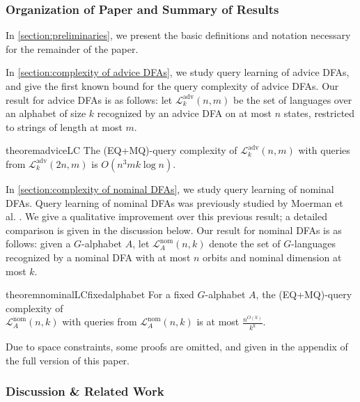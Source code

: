 \documentclass[runningheads]{llncs}
\newcommand{\mc}{\mathcal}
\newif\ifappendix
\begin{document}
\subsubsection{Organization of Paper and Summary of Results}

In \autoref{section:preliminaries}, we present the basic definitions and notation necessary for the remainder of the paper.

In \autoref{section:complexity of advice DFAs}, we study query learning of advice DFAs, and give the first known bound for the query complexity of advice DFAs.
Our result for advice DFAs is as follows: let $\mc L^{\text{adv}}_k(n,m)$ be the set of languages over an alphabet of size $k$ recognized by an advice DFA on at most $n$ states, restricted to strings of length at most $m$.
\begin{restatable*}{theorem}{adviceLC} \label{thm:EQ+MQ learning complexity of DFAs with advice}
    The (EQ+MQ)-query complexity of $\mc L^{\text{adv}}_k(n,m)$ with queries from $\mc L^{\text{adv}}_k(2n,m)$ is $O(n^3mk \log n)$.
\end{restatable*}

In \autoref{section:complexity of nominal DFAs}, we study query learning of nominal DFAs.
Query learning of nominal DFAs was previously studied by Moerman et al. \cite{moerman-etal:learning-nominal-automata}.
We give a qualitative improvement over this previous result; a detailed comparison is given in the discussion below.
Our result for nominal DFAs is as follows: given a $G$-alphabet $A$, let $\mc L^{\text{nom}}_A(n,k)$ denote the set of $G$-languages recognized by a nominal DFA with at most $n$ orbits and nominal dimension at most $k$.
\begin{restatable*}{theorem}{nominalLCfixedalphabet}
    For a fixed $G$-alphabet $A$, the (EQ+MQ)-query complexity of \\$\mc L^{\text{nom}}_A(n,k)$ with queries from $\mc L^{\text{nom}}_A(n,k)$ is at most $\frac{n^{O(k)}}{k^k}$.
\end{restatable*}


\ifappendix \else Due to space constraints, some proofs are omitted, and given in the appendix of the full version of this paper. \fi


\subsubsection{Discussion \& Related Work}
\end{document}
